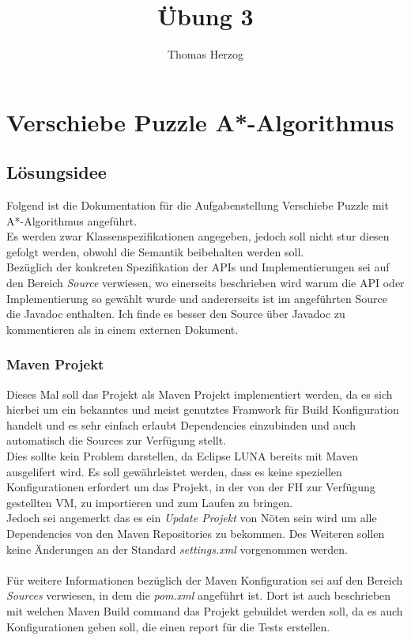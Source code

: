 \documentclass[11pt, a4paper, twoside]{article}   	%
\title{Übung 3}
\author{Thomas Herzog}
\newcommand{\ideaSection}{Lösungsidee}
\begin{document}
\setlength{\headheight}{15mm}

{\color{myred}
	\section
		{Verschiebe Puzzle A*-Algorithmus}
}

\subsection{\ideaSection}
Folgend ist die Dokumentation für die Aufgabenstellung Verschiebe Puzzle mit A*-Algorithmus angeführt. \\
Es werden zwar Klassenspezifikationen angegeben, jedoch soll nicht stur diesen gefolgt werden, obwohl die Semantik beibehalten werden soll.\\
Bezüglich der konkreten Spezifikation der APIs und Implementierungen sei auf den Bereich \emph{Source} verwiesen, wo einerseits beschrieben wird warum die API oder Implementierung so gewählt wurde und andererseits ist im angeführten Source die Javadoc enthalten. Ich finde es besser den Source über Javadoc zu kommentieren als in einem externen Dokument.

\subsubsection{Maven Projekt}
Dieses Mal soll das Projekt als Maven Projekt implementiert werden, da es sich hierbei um ein bekanntes und meist genutztes Framwork für Build Konfiguration handelt und es sehr einfach erlaubt Dependencies einzubinden und auch automatisch die Sources zur Verfügung stellt.\\
Dies sollte kein Problem darstellen, da Eclipse LUNA bereits mit Maven ausgelifert wird. Es soll gewährleistet werden, dass es keine speziellen Konfigurationen erfordert um das Projekt, in der von der FH zur Verfügung gestellten VM, zu importieren und zum Laufen zu bringen.\\
Jedoch sei angemerkt das es ein \emph{Update Projekt} von Nöten sein wird um alle Dependencies von den Maven Repositories zu bekommen. Des Weiteren sollen keine Änderungen an der Standard \emph{settings.xml} vorgenommen werden.\\\\
Für weitere Informationen bezüglich der Maven Konfiguration sei auf den Bereich \emph{Sources} verwiesen, in dem die \emph{pom.xml} angeführt ist. Dort ist auch beschrieben mit welchen Maven Build command das Projekt gebuildet werden soll, da es auch Konfigurationen geben soll, die einen report für die Tests erstellen. 
\end{document}
